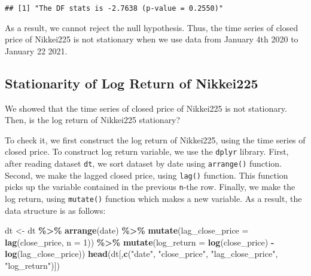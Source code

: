 \documentclass[
  12pt,
]{article}
\newenvironment{Shaded}{\begin{snugshade}}{\end{snugshade}}
\newcommand{\DataTypeTok}[1]{\textcolor[rgb]{0.13,0.29,0.53}{#1}}
\newcommand{\DecValTok}[1]{\textcolor[rgb]{0.00,0.00,0.81}{#1}}
\newcommand{\KeywordTok}[1]{\textcolor[rgb]{0.13,0.29,0.53}{\textbf{#1}}}
\newcommand{\NormalTok}[1]{#1}
\newcommand{\OperatorTok}[1]{\textcolor[rgb]{0.81,0.36,0.00}{\textbf{#1}}}
\newcommand{\StringTok}[1]{\textcolor[rgb]{0.31,0.60,0.02}{#1}}
\begin{document}
\begin{verbatim}
## [1] "The DF stats is -2.7638 (p-value = 0.2550)"
\end{verbatim}

As a result, we cannot reject the null hypothesis. Thus, the time series
of closed price of Nikkei225 is not stationary when we use data from
January 4th 2020 to January 22 2021.

\hypertarget{stationarity-of-log-return-of-nikkei225}{%
\subsection{Stationarity of Log Return of
Nikkei225}\label{stationarity-of-log-return-of-nikkei225}}

We showed that the time series of closed price of Nikkei225 is not
stationary. Then, is the log return of Nikkei225 stationary?

To check it, we first construct the log return of Nikkei225, using the
time series of closed price. To construct log return variable, we use
the \texttt{dplyr} library. First, after reading dataset \texttt{dt}, we
sort dataset by date using \texttt{arrange()} function. Second, we make
the lagged closed price, using \texttt{lag()} function. This function
picks up the variable contained in the previous \texttt{n}-the row.
Finally, we make the log return, using \texttt{mutate()} function which
makes a new variable. As a result, the data structure is as follows:

\begin{Shaded}
\begin{Highlighting}[]
\NormalTok{dt \textless{}{-}}\StringTok{ }\NormalTok{dt }\OperatorTok{\%\textgreater{}\%}\StringTok{ }
\StringTok{  }\KeywordTok{arrange}\NormalTok{(date) }\OperatorTok{\%\textgreater{}\%}\StringTok{ }
\StringTok{  }\KeywordTok{mutate}\NormalTok{(}\DataTypeTok{lag\_close\_price =} \KeywordTok{lag}\NormalTok{(close\_price, }\DataTypeTok{n =} \DecValTok{1}\NormalTok{)) }\OperatorTok{\%\textgreater{}\%}\StringTok{ }
\StringTok{  }\KeywordTok{mutate}\NormalTok{(}\DataTypeTok{log\_return =} \KeywordTok{log}\NormalTok{(close\_price) }\OperatorTok{{-}}\StringTok{ }\KeywordTok{log}\NormalTok{(lag\_close\_price))}
\KeywordTok{head}\NormalTok{(dt[,}\KeywordTok{c}\NormalTok{(}\StringTok{"date"}\NormalTok{, }\StringTok{"close\_price"}\NormalTok{, }\StringTok{"lag\_close\_price"}\NormalTok{, }\StringTok{"log\_return"}\NormalTok{)])}
\end{Highlighting}
\end{Shaded}
\end{document}
